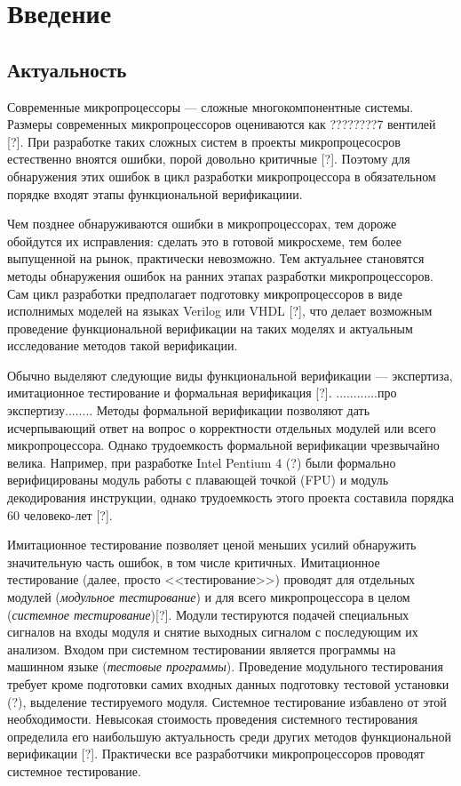 \chapter*{Введение}

\section*{Актуальность}

Современные микропроцессоры --- сложные многокомпонентные системы. Размеры современных микропроцессоров оцениваются как ????????7 вентилей [?]. При разработке таких сложных систем в проекты микропроцесосров естественно вноятся ошибки, порой довольно критичные [?]. Поэтому для обнаружения этих ошибок в цикл разработки микропроцессора в обязательном порядке входят этапы функциональной верификациии.

Чем позднее обнаруживаются ошибки в микропроцессорах, тем дороже обойдутся их исправления: сделать это в готовой микросхеме, тем более выпущенной на рынок, практически невозможно. Тем актуальнее становятся методы обнаружения ошибок на ранних этапах разработки микропроцессоров. Сам цикл разработки предполагает подготовку микропроцессоров в виде исполнимых моделей на языках Verilog или VHDL [?], что делает возможным проведение функциональной верификации на таких моделях и актуальным исследование методов такой верификации.

Обычно выделяют следующие виды функциональной верификации --- экспертиза, имитационное тестирование и формальная верификация [?]. ............про экспертизу........ Методы формальной верификации позволяют дать исчерпывающий ответ на вопрос о корректности отдельных модулей или всего микропроцессора. Однако трудоемкость формальной верификации чрезвычайно велика. Например, при разработке Intel Pentium 4 (?) были формально верифицированы модуль работы с плавающей точкой (FPU) и модуль декодирования инструкции, однако трудоемкость этого проекта составила порядка 60 человеко-лет [?].

Имитационное тестирование позволяет ценой меньших усилий обнаружить значительную часть ошибок, в том числе критичных. Имитационное тестирование (далее, просто <<тестирование>>) проводят для отдельных модулей (\emph{модульное тестирование}) и для всего микропроцессора в целом (\emph{системное тестирование})[?]. Модули тестируются подачей специальных сигналов на входы модуля и снятие выходных сигналом с последующим их анализом. Входом при системном тестировании является программы на машинном языке (\emph{тестовые программы}). Проведение модульного тестирования требует кроме подготовки самих входных данных подготовку тестовой установки (?), выделение тестируемого модуля. Системное тестирование избавлено от этой необходимости. Невысокая стоимость проведения системного тестирования определила его наибольшую актуальность среди других методов функциональной верификации [?]. Практически все разработчики микропроцессоров проводят системное тестирование.

